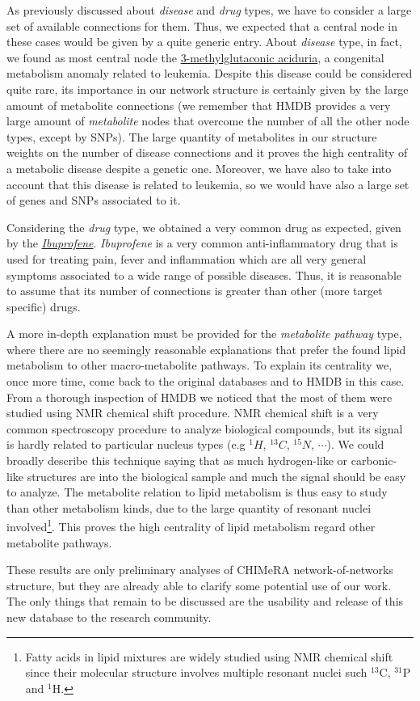 \documentclass{standalone}
\begin{document}
As previously discussed about \emph{disease} and \emph{drug} types, we have to consider a large set of available connections for them.
Thus, we expected that a central node in these cases would be given by a quite generic entry.
About \emph{disease} type, in fact, we found as most central node the \href{https://en.wikipedia.org/wiki/3-Methylglutaconic_aciduria}{\textsf{3-methylglutaconic aciduria}}, a congenital metabolism anomaly related to leukemia.
Despite this disease could be considered quite rare, its importance in our network structure is certainly given by the large amount of metabolite connections (we remember that HMDB provides a very large amount of \emph{metabolite} nodes that overcome the number of all the other node types, except by SNPs).
The large quantity of metabolites in our structure weights on the number of disease connections and it proves the high centrality of a metabolic disease despite a genetic one.
Moreover, we have also to take into account that this disease is related to leukemia, so we would have also a large set of genes and SNPs associated to it.

Considering the \emph{drug} type, we obtained a very common drug as expected, given by the \href{https://en.wikipedia.org/wiki/Ibuprofen}{\emph{Ibuprofene}}.
\emph{Ibuprofene} is a very common anti-inflammatory drug that is used for treating pain, fever and inflammation which are all very general symptoms associated to a wide range of possible diseases.
Thus, it is reasonable to assume that its number of connections is greater than other (more target specific) drugs.

A more in-depth explanation must be provided for the \emph{metabolite pathway} type, where there are no seemingly reasonable explanations that prefer the found \textsf{lipid metabolism} to other macro-metabolite pathways.
To explain its centrality we, once more time, come back to the original databases and to HMDB in this case.
From a thorough inspection of HMDB we noticed that the most of them were studied using NMR chemical shift procedure.
NMR chemical shift is a very common spectroscopy procedure to analyze biological compounds, but its signal is hardly related to particular nucleus types (e.g $^1H$, $^{13}C$, $^{15}N$, $\cdots$).
We could broadly describe this technique saying that as much hydrogen-like or carbonic-like structures are into the biological sample and much the signal should be easy to analyze.
The metabolite relation to lipid metabolism is thus easy to study than other metabolism kinds, due to the large quantity of resonant nuclei involved\footnote{
  Fatty acids in lipid mixtures are widely studied using NMR chemical shift since their molecular structure involves multiple resonant nuclei such $^{13}$C, $^{31}$P and $^1$H.
}.
This proves the high centrality of \textsf{lipid metabolism} regard other metabolite pathways.

These results are only preliminary analyses of \textsf{CHIMeRA} network-of-networks structure, but they are already able to clarify some potential use of our work.
The only things that remain to be discussed are the usability and release of this new database to the research community.
\end{document}
